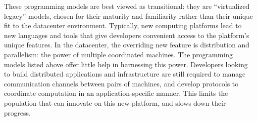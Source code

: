 \documentclass{sig-alternate}
\begin{document}
These programming models are best viewed as transitional: they are ``virtualized legacy'' models, chosen for their maturity and familiarity rather than their unique fit to the datacenter environment.  Typically, new computing platforms lead to new languages and tools that give developers convenient access to the platform's unique features.  In the datacenter, the overriding new feature is distribution and parallelism: the power of multiple coordinated machines.  The programming models listed above offer little help in harnessing this power.  Developers looking to build distributed applications and infrastructure are still required to manage communication channels between pairs of machines, and develop protocols to coordinate computation in an application-specific manner.  This limits the population that can innovate on this new platform, and slows down their progress.
\end{document}

